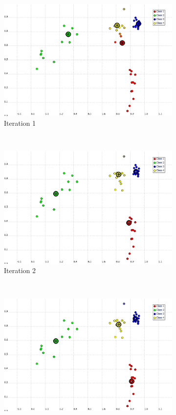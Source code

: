 \documentclass[a4paper,10pt]{article}
\begin{document}
\begin{figure}[H]
\begin{subfigure}[t]{0.2\textwidth}
      \includegraphics[width=\textwidth]{pictures/K-Means-4K-beta-30-it1(2).png}
      \caption{Iteration 1}
      \label{fig:K-Means-4K-beta-30-it1-2}
     \end{subfigure}
      ~
    \begin{subfigure}[t]{0.2\textwidth}
      \centering
      \includegraphics[width=\textwidth]{pictures/K-Means-4K-beta-30-it2(2).png}
      \caption{Iteration 2}
      \label{fig:K-Means-4K-beta-30-it2-2}
     \end{subfigure}
      ~
    \begin{subfigure}[t]{0.2\textwidth}
      \centering
      \includegraphics[width=\textwidth]{pictures/K-Means-4K-beta-30-it3(2).png}

\end{subfigure}
\end{figure}
\end{document}
